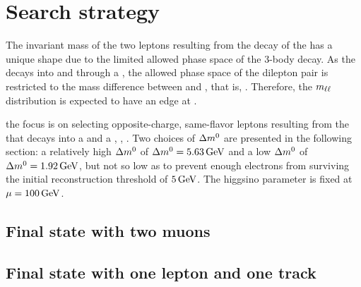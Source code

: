 \clearpage
\section{Search strategy}
\label{sec:search-strategy}

The invariant mass of the two leptons resulting from the decay of the \neutt has a unique shape due to the limited allowed phase space of the 3-body decay. As the \neutt decays into \neuto and \ellell through a \PZstar, the allowed phase space of the dilepton pair is restricted to the mass difference between \neutt and \neuto, that is, \dm. Therefore, the $m_{\ell\ell}$ distribution is expected to have an edge at \dm. 

the focus is on selecting opposite-charge, same-flavor leptons \ellell resulting from the \neutt that decays into a \neuto and a \PZstar, \ie, \neuttdecay. Two choices of $\Delta m^0$ are presented in the following section: a relatively high $\Delta m^0$ of $\Delta m^0=5.63\,\text{Ge\hspace{-.08em}V}$ and a low $\Delta m^0$ of $\Delta m^0=1.92\,\text{Ge\hspace{-.08em}V}$, but not so low as to prevent enough electrons from surviving the initial reconstruction \pt threshold of $5\,\text{Ge\hspace{-.08em}V}$. The higgsino parameter is fixed at $\mu=100\,\text{Ge\hspace{-.08em}V}$.

\subsection{Final state with two muons}
\label{sec:dimuon-category}

\subsection{Final state with one lepton and one track}
\label{sec:exclusive-track-category}


